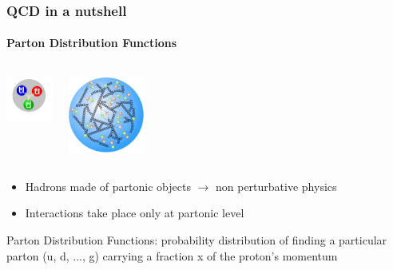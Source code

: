 \documentclass[aspectratio=43]{beamer}
\begin{document}
\begin{frame}
	
	\frametitle{QCD in a nutshell}
	\framesubtitle{Parton Distribution Functions}
	
	\begin{columns}
	
	
	\includegraphics[width = 1.5cm]{plots/section1/proton.png}
	
	
	\includegraphics[width = 2.5cm]{plots/section1/proton2.jpg}
	
	\end{columns}
	
	\begin{itemize}
		\item Hadrons made of partonic objects $\longrightarrow$ non perturbative physics
		\item Interactions take place only at partonic level
	\end{itemize}
	
	{\color{blue}Parton Distribution Functions: probability distribution of finding a particular parton (u, d, ..., g) carrying a fraction x of the proton's momentum}

\end{frame}
\end{document}
